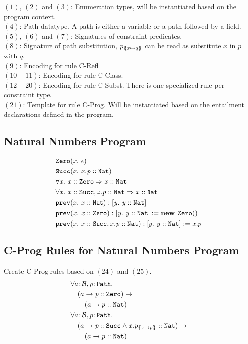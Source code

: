 \documentclass[a4paper]{article}
\begin{document}
$(1)$, $(2)$ and $(3)$: Enumeration types, will be instantiated based on the program context.\\
$(4)$: Path datatype. A path is either a variable or a path followed by a field.\\
$(5)$, $(6)$ and $(7)$: Signatures of constraint predicates.\\
$(8)$: Signature of path substitution, $p_{\{\mskip-6.9mu\{ x \mapsto q \}\mskip-6.9mu\}}$ can be read as substitute $x$ in $p$ with $q$.\\
$(9)$: Encoding for rule C-Refl.\\
$(10-11)$: Encoding for rule C-Class.\\
$(12-20)$: Encoding for rule C-Subst. There is one specialized rule per constraint type.\\
$(21)$: Template for rule C-Prog. Will be instantiated based on the entailment declarations defined in the program.

\subsection{Natural Numbers Program}
\begin{align}
&\mathit{\texttt{Zero}}(\mathit{x}.\ \mathit{\epsilon})\\
&\mathit{\texttt{Succ}}(\mathit{x}.\ \mathit{\mathit{x.p} :: \mathit{\texttt{Nat}}})\\
& \forall \mathit{x}.\ \mathit{\mathit{x} :: \mathit{\texttt{Zero}}} \Rightarrow \mathit{\mathit{x} :: \mathit{\texttt{Nat}}}\\
& \forall \mathit{x}.\ \mathit{\mathit{x} :: \mathit{\texttt{Succ}}, \mathit{x.p} :: \mathit{\texttt{Nat}}} \Rightarrow \mathit{\mathit{x} :: \mathit{\texttt{Nat}}}\\
&\mathit{\texttt{prev}}(\mathit{x}.\ \mathit{\mathit{x} :: \mathit{\texttt{Nat}}}): \mathit{[y.\ \mathit{\mathit{y} :: \mathit{\texttt{Nat}}}]}\\
&\mathit{\texttt{prev}}(\mathit{x}.\ \mathit{\mathit{x} :: \mathit{\texttt{Zero}}}): \mathit{[y.\ \mathit{\mathit{y} :: \mathit{\texttt{Nat}}}]} := \mathit{\textbf{new } \mathit{\texttt{Zero}}()}\\
&\mathit{\texttt{prev}}(\mathit{x}.\ \mathit{\mathit{x} :: \mathit{\texttt{Succ}}, \mathit{x.p} :: \mathit{\texttt{Nat}}}): \mathit{[y.\ \mathit{\mathit{y} :: \mathit{\texttt{Nat}}}]} := \mathit{x.p}
\end{align}

\subsection{C-Prog Rules for Natural Numbers Program}
Create C-Prog rules based on $(24)$ and $(25)$.
\begin{align}
  &\forall \sortedVar{a}{\TBool}, \sortedVar{p}{\Path}.\\
  &\quad (a \rightarrow \instOf{p}{\Zero}) \rightarrow\\
  &\qquad (a \rightarrow \instOf{p}{\Nat})\\
  &\forall \sortedVar{a}{\TBool}, \sortedVar{p}{\Path}.\\
  &\quad (a \rightarrow \instOf{p}{\Succ} \land \instOf{x.p_{\sub{x}{p}}}{\Nat}) \rightarrow\\
  &\qquad (a \rightarrow \instOf{p}{\Nat})
\end{align}
\end{document}
